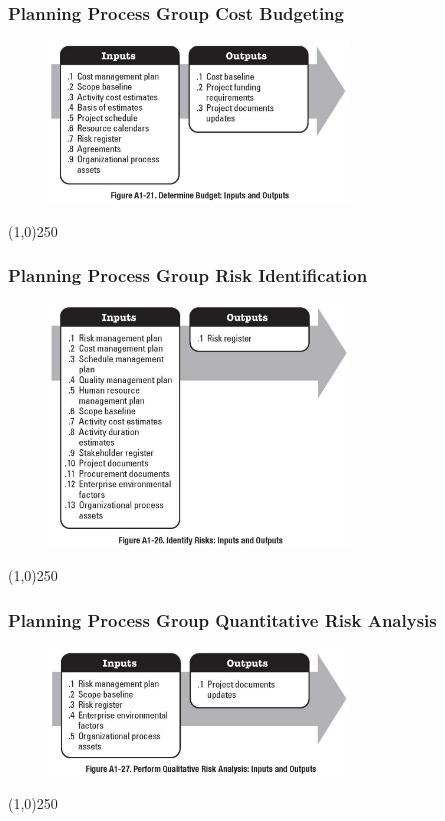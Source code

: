 \begin{frame}
\frametitle{Planning Process Group \hfill Cost Budgeting}
 \begin{figure}
 	\centering
 		\includegraphics[width = 8cm]{images/FigA1-21.jpg}
 	\label{fig:A1-21}
 \end{figure}
\end{frame}
\begin{center}\line(1,0){250}\end{center}



\begin{frame}
\frametitle{Planning Process Group \hfill Risk Identification}
 \begin{figure}
 	\centering
 		\includegraphics[width = 8cm]{images/FigA1-26.jpg}
 	\label{fig:A1-26}
 \end{figure}
\end{frame}
\begin{center}\line(1,0){250}\end{center}



\begin{frame}
\frametitle{Planning Process Group \hfill Quantitative Risk Analysis}
 \begin{figure}
 	\centering
 		\includegraphics[width = 8cm]{images/FigA1-27.jpg}
 	\label{fig:A1-27}
 \end{figure}
\end{frame}
\begin{center}\line(1,0){250}\end{center}



